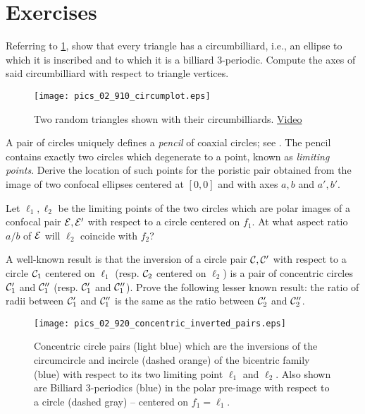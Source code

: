 \section{Exercises}

\begin{exercise}
\label{ex:02-circumbilliard} 
Referring to \cref{fig:02-circumbilliard}, show that every triangle has a circumbilliard, i.e., an ellipse to which it is inscribed and to which it is a billiard 3-periodic. Compute the axes of said circumbilliard with respect to triangle vertices. 
\end{exercise}

\begin{figure}
    \centering
    \texttt{[image: pics\_02\_910\_circumplot.eps]}
    \caption{Two random triangles shown with their circumbilliards. \href{https://youtu.be/vSCnorIJ2X8}{Video}}
    \label{fig:02-circumbilliard}
\end{figure}

\begin{exercise}
A pair of circles uniquely defines a {\em pencil} of coaxial circles; see \cite[Limiting Points]{mw}. The pencil contains exactly two circles which degenerate to a point, known as {\em limiting points}. Derive the location of such points for the poristic pair obtained from the image of two confocal ellipses centered at $[0,0]$ and with axes $a,b$ and $a',b'$.
\end{exercise}

\begin{exercise}
Let $\ell_1,\ell_2$ be the limiting points of the two circles which are polar images of a confocal pair $\mathcal{E},\mathcal{E}'$ with respect to a circle centered on $f_1$. At what aspect ratio $a/b$ of $\mathcal{E}$ will $\ell_2$ coincide with $f_2$?
\end{exercise}

\begin{exercise}
A well-known result is that the inversion of a circle pair $\mathcal{C},\mathcal{C}'$ with respect to a circle $\mathcal{C}_1$ centered on $\ell_1$ (resp. $\mathcal{C}_2$ centered on $\ell_2$) is a pair of concentric circles $\mathcal{C}_1'$ and $\mathcal{C}_1''$ (resp. $\mathcal{C}_1'$ and $\mathcal{C}_1''$). Prove the following lesser known result: the ratio of radii between $\mathcal{C}_1'$ and $\mathcal{C}_1''$ is the same as the ratio between $\mathcal{C}_2'$ and $\mathcal{C}_2''$. 
\end{exercise}


\begin{figure}
    \centering
    \texttt{[image: pics\_02\_920\_concentric\_inverted\_pairs.eps]}
    \caption{Concentric circle pairs (light blue) which are the inversions of the circumcircle and incircle (dashed orange) of the bicentric family  (blue) with respect to its two limiting point $\ell_1$ and $\ell_2$. Also shown are Billiard 3-periodics (blue) in the polar pre-image with respect to a circle (dashed gray) -- centered on $f_1=\ell_1$.}
    \label{fig:02-concentric-inverted}
\end{figure}

